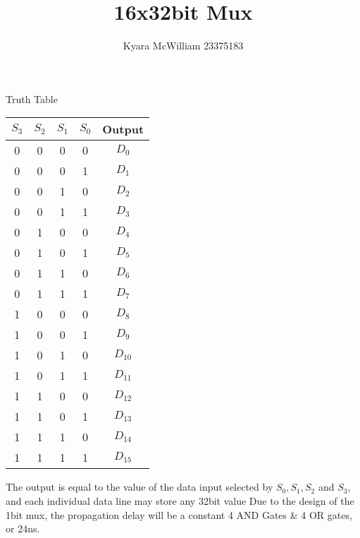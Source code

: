 \documentclass{article}
\title{16x32bit Mux}
\author{Kyara McWilliam 23375183}
\date{}
\begin{document}
\maketitle

Truth Table

\begin{tabular}{ |c|c|c|c|c| }
\hline
$S_3$ & $S_2$ & $S_1$ & $S_0$ & Output \\
\hline
0 & 0 & 0 & 0 & $D_0$ \\
0 & 0 & 0 & 1 & $D_1$ \\
0 & 0 & 1 & 0 & $D_2$ \\
0 & 0 & 1 & 1 & $D_3$ \\
0 & 1 & 0 & 0 & $D_4$ \\
0 & 1 & 0 & 1 & $D_5$ \\
0 & 1 & 1 & 0 & $D_6$ \\
0 & 1 & 1 & 1 & $D_7$ \\
1 & 0 & 0 & 0 & $D_8$ \\
1 & 0 & 0 & 1 & $D_9$ \\
1 & 0 & 1 & 0 & $D_{10}$ \\
1 & 0 & 1 & 1 & $D_{11}$ \\
1 & 1 & 0 & 0 & $D_{12}$ \\
1 & 1 & 0 & 1 & $D_{13}$ \\
1 & 1 & 1 & 0 & $D_{14}$ \\
1 & 1 & 1 & 1 & $D_{15}$ \\
\hline
\end{tabular}
\hfill \break

The output is equal to the value of the data input selected by $S_0, S_1, S_2$ and $S_3$, and each individual data line may store any 32bit value \newline
Due to the design of the 1bit mux, the propagation delay will be a constant 4 AND Gates \& 4 OR gates, or 24ns.
\end{document}
